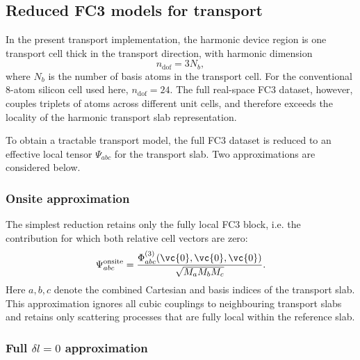 \subsection{Reduced FC3 models for transport}
\label{sec:assembly_fc3}

In the present transport implementation, the harmonic device region is
one transport cell thick in the transport direction, with harmonic
dimension
\begin{equation}
  n_\mathrm{dof} = 3N_b,
\end{equation}
where $N_b$ is the number of basis atoms in the transport cell.  For
the conventional 8-atom silicon cell used here, $n_\mathrm{dof}=24$.
The full real-space FC3 dataset, however, couples triplets of atoms
across different unit cells, and therefore exceeds the locality of the
harmonic transport slab representation.

To obtain a tractable transport model, the full FC3 dataset is reduced
to an effective local tensor $\Psi_{abc}$ for the transport slab.  Two
approximations are considered below.

\subsubsection{Onsite approximation}

The simplest reduction retains only the fully local FC3 block, i.e. the
contribution for which both relative cell vectors are zero:
\begin{equation}
  \Psi_{abc}^{\mathrm{onsite}}
  =
  \frac{\Phi^{(3)}_{abc}(\vc{0},\vc{0},\vc{0})}
       {\sqrt{M_a M_b M_c}}.
\end{equation}
Here $a,b,c$ denote the combined Cartesian and basis indices of the
transport slab.  This approximation ignores all cubic couplings to
neighbouring transport slabs and retains only scattering processes that
are fully local within the reference slab.

\subsubsection{Full \texorpdfstring{$\delta l = 0$}{delta l = 0} approximation}

